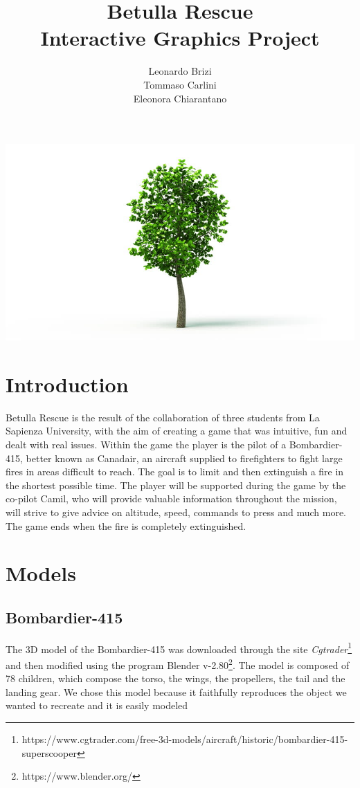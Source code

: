 \documentclass{article}
\title{Betulla Rescue \\ Interactive Graphics Project}
\author{Leonardo Brizi\\Tommaso Carlini\\Eleonora Chiarantano}
\begin{document}
\maketitle

\includegraphics[width=\linewidth]{immag.png}

\newpage

\section*{Introduction}
Betulla Rescue is the result of the collaboration of three students from La Sapienza University, with the aim of creating a game that was intuitive, fun and dealt with real issues. Within the game the player is the pilot of a Bombardier-415, better known as Canadair, an aircraft supplied to firefighters to fight large fires in areas difficult to reach. The goal is to limit and then extinguish a fire in the shortest possible time. The player will be supported during the game by the co-pilot Camil, who will provide valuable information throughout the mission, will strive to give advice on altitude, speed, commands to press and much more. The game ends when the fire is completely extinguished.

\section*{Models}

\subsection*{Bombardier-415}
The 3D model of the Bombardier-415 was downloaded through the site \textit{Cgtrader}\footnote{https://www.cgtrader.com/free-3d-models/aircraft/historic/bombardier-415-superscooper} and then modified using the program Blender v-2.80\footnote{https://www.blender.org/}. The model is composed of 78 children, which compose the torso, the wings, the propellers, the tail and the landing gear. We chose this model because it faithfully reproduces the object we wanted to recreate and it is easily modeled
\end{document}
